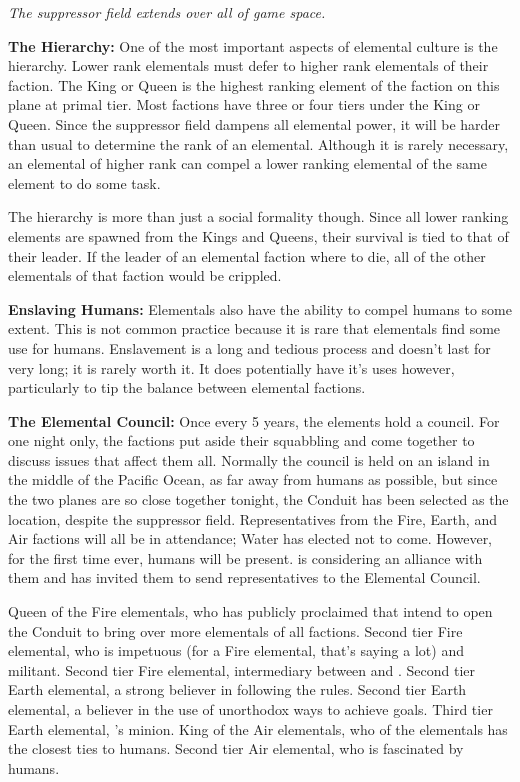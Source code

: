 \documentclass[blue]{elementals}
\begin{document}
\emph{The suppressor field extends over all of game space.}

{\bf The Hierarchy:}
One of the most important aspects of elemental culture is the hierarchy. Lower rank elementals must defer to higher rank elementals of their faction. The King or Queen is the highest ranking element of the faction on this plane at primal tier. Most factions have three or four tiers under the King or Queen.  Since the suppressor field dampens all elemental power, it will be harder than usual to determine the rank of an elemental. Although it is rarely necessary, an elemental of higher rank can compel a lower ranking elemental of the same element to do some task.

The hierarchy is more than just a social formality though. Since all lower ranking elements are spawned from the Kings and Queens, their survival is tied to that of their leader. If the leader of an elemental faction where to die, all of the other elementals of that faction would be crippled.

{\bf Enslaving Humans:}
Elementals also have the ability to compel humans to some extent. This is not common practice because it is rare that elementals find some use for humans. Enslavement is a long and tedious process and doesn't last for very long; it is rarely worth it. It does potentially have it's uses however, particularly to tip the balance between elemental factions.

{\bf The Elemental Council:}
Once every 5 years, the elements hold a council. For one night only, the factions put aside their squabbling and come together to discuss issues that affect them all. Normally the council is held on an island in the middle of the Pacific Ocean, as far away from humans as possible, but since the two planes are so close together tonight, the Conduit has been selected as the location, despite the suppressor field.  Representatives from the Fire, Earth, and Air factions will all be in attendance; Water has elected not to come.  However, for the first time ever, humans will be present.  \cKing{} is considering an alliance with them and has invited them to send representatives to the Elemental Council.

\begin{members}
  \member{\cQueen{}} Queen of the Fire elementals, who has publicly proclaimed that \cQueen{\they} intend to open the Conduit to bring over more elementals of all factions.
  \member{\cPyro{}} Second tier Fire elemental, who is impetuous (for a Fire elemental, that's saying a lot) and militant.
  \member{\cJuliet{}} Second tier Fire elemental, intermediary between \cQueen{} and \cKing{}.
  \member{\cLoyal{}} Second tier Earth elemental, a strong believer in following the rules.
  \member{\cRogue{}} Second tier Earth elemental, a believer in the use of unorthodox ways to achieve goals.
  \member{\cMinion{}} Third tier Earth elemental, \cLoyal{}'s minion.
  \member{\cKing{}} King of the Air elementals, who of the elementals has the closest ties to humans.
  \member{\cNaturalist{}} Second tier Air elemental, who is fascinated by humans.
\end{members}
\end{document}
